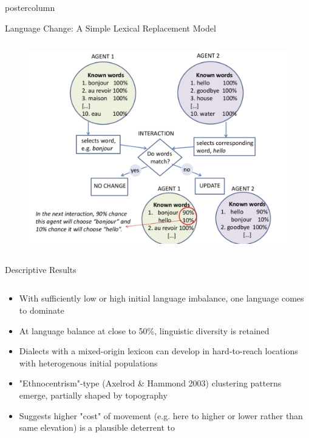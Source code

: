 \documentclass[final,hyperref={pdfpagelabels=false}]{beamer}
\begin{document}
\begin{frame}
\begin{columns}[T]
\begin{column}{.33\textwidth}
\begin{beamercolorbox}[center,wd=\textwidth]{postercolumn}
\begin{minipage}[T]{.95\textwidth}
{            \begin{block}{Language Change: A Simple Lexical Replacement Model}
              \begin{columns}
                \begin{column}{.99\textwidth}
                  \begin{figure}[h!]
                    \centering
                    \includegraphics[width=0.80\linewidth]{images/language_change_model}
                  \end{figure}             
              \end{column}
              \end{columns}
            \end{block}
            \begin{block}{Descriptive Results}
              \begin{columns}
                \begin{column}{.99\textwidth}
                  \begin{itemize}
                    \item With sufficiently low or high initial language imbalance, one language comes to dominate
                    \item At language balance at close to 50\%, linguistic diversity is retained
                    \item Dialects with a mixed-origin lexicon can develop in hard-to-reach locations with heterogenous initial populations
                    \item "Ethnocentrism"-type (Axelrod \& Hammond 2003) clustering patterns emerge, partially shaped by topography
                    \item Suggests higher "cost" of movement (e.g. here to higher or lower rather than same elevation) is a plausible deterrent to

\end{itemize}
\end{column}
\end{columns}
\end{block}}
\end{minipage}
\end{beamercolorbox}
\end{column}
\end{columns}
\end{frame}
\end{document}
